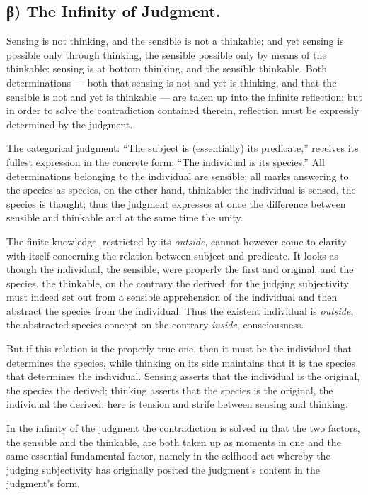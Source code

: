 \documentclass[12pt]{book}
\begin{document}
\subsection*{β) The Infinity of Judgment.}

Sensing is not thinking, and the sensible is not a thinkable; and
yet sensing is possible only through thinking, the sensible possible
only by means of the thinkable: sensing is at bottom thinking, and
the sensible thinkable. Both determinations --- both that sensing is
not and yet is thinking, and that the sensible is not and yet is
thinkable --- are taken up into the infinite reflection; but in
order to solve the contradiction contained therein, reflection must
be expressly determined by the judgment.

The categorical judgment: ``The subject is (essentially) its
predicate,'' receives its fullest expression in the concrete form:
``The individual is its species.'' All determinations belonging to
the individual are sensible; all marks answering to the species as
species, on the other hand, thinkable: the individual is sensed, the
species is thought; thus the judgment expresses at once the
difference between sensible and thinkable and at the same time the
unity.

The finite knowledge, restricted by its \emph{outside}, cannot
however come to clarity with itself concerning the relation between
subject and predicate. It looks as though the individual, the
sensible, were properly the first and original, and the species, the
thinkable, on the contrary the derived; for the judging subjectivity
must indeed set out from a sensible apprehension of the individual
and then abstract the species from the individual. Thus the existent
individual is \emph{outside}, the abstracted species-concept on the
contrary \emph{inside}, consciousness.

But if this relation is the properly true one, then it must be the
individual that determines the species, while thinking on its side
maintains that it is the species that determines the individual.
Sensing asserts that the individual is the original, the species the
derived; thinking asserts that the species is the original, the
individual the derived: here is tension and strife between sensing
and thinking.

In the infinity of the judgment the contradiction is solved in that
the two factors, the sensible and the thinkable, are both taken up
as moments in one and the same essential fundamental factor, namely
in the selfhood-act whereby the judging subjectivity has originally
posited the judgment's content in the judgment's form.
\end{document}
